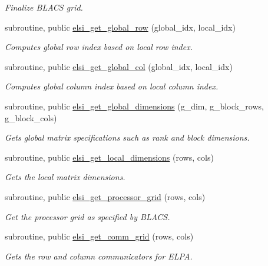 \begin{DoxyCompactItemize}
\begin{DoxyCompactList}\small\item\em Finalize B\+L\+A\+C\+S grid. \end{DoxyCompactList}\item 
subroutine, public \hyperlink{namespacempi__tools_a3fa1d32ce548146736f4c270cf1e9d9f}{elsi\+\_\+get\+\_\+global\+\_\+row} (global\+\_\+idx, local\+\_\+idx)
\begin{DoxyCompactList}\small\item\em Computes global row index based on local row index. \end{DoxyCompactList}\item 
subroutine, public \hyperlink{namespacempi__tools_a17c5d512655384ab86d658548cda1525}{elsi\+\_\+get\+\_\+global\+\_\+col} (global\+\_\+idx, local\+\_\+idx)
\begin{DoxyCompactList}\small\item\em Computes global column index based on local column index. \end{DoxyCompactList}\item 
subroutine, public \hyperlink{namespacempi__tools_a18e3203faf14db998f265fa779a076e6}{elsi\+\_\+get\+\_\+global\+\_\+dimensions} (g\+\_\+dim, g\+\_\+block\+\_\+rows, g\+\_\+block\+\_\+cols)
\begin{DoxyCompactList}\small\item\em Gets global matrix specifications such as rank and block dimensions. \end{DoxyCompactList}\item 
subroutine, public \hyperlink{namespacempi__tools_aa24bc8448a5c6af4608ad752e692cb5c}{elsi\+\_\+get\+\_\+local\+\_\+dimensions} (rows, cols)
\begin{DoxyCompactList}\small\item\em Gets the local matrix dimensions. \end{DoxyCompactList}\item 
subroutine, public \hyperlink{namespacempi__tools_aa9343d548ec1446e891be7c5869f3d04}{elsi\+\_\+get\+\_\+processor\+\_\+grid} (rows, cols)
\begin{DoxyCompactList}\small\item\em Get the processor grid as specified by B\+L\+A\+C\+S. \end{DoxyCompactList}\item 
subroutine, public \hyperlink{namespacempi__tools_afdc591a3869677887dd297a27e3c1969}{elsi\+\_\+get\+\_\+comm\+\_\+grid} (rows, cols)
\begin{DoxyCompactList}\small\item\em Gets the row and column communicators for E\+L\+P\+A. \end{DoxyCompactList}\end{DoxyCompactItemize}
